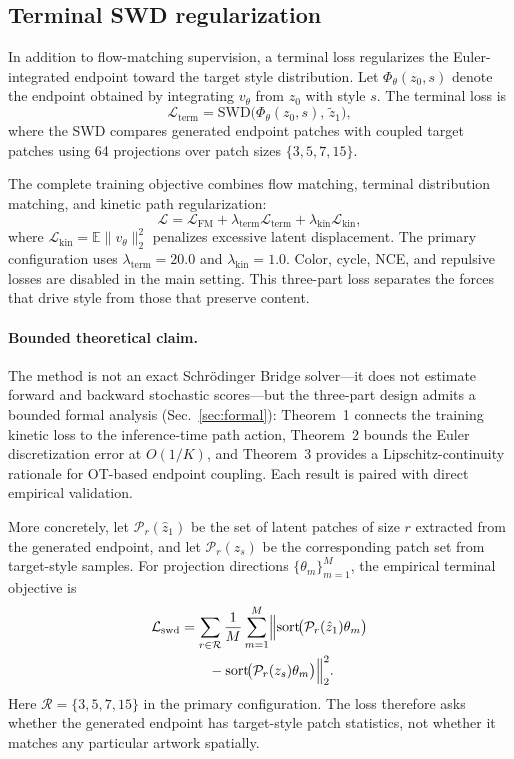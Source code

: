 ﻿\documentclass[letterpaper]{article}
\begin{document}
\subsection{Terminal SWD regularization}
In addition to flow-matching supervision, a terminal loss regularizes the Euler-integrated endpoint toward the target style distribution. Let $\Phi_\theta(z_0,s)$ denote the endpoint obtained by integrating $v_\theta$ from $z_0$ with style $s$. The terminal loss is
\begin{equation}
    \mathcal{L}_{\mathrm{term}} = \mathrm{SWD}\bigl(\Phi_\theta(z_0,s),\,\tilde{z}_1\bigr),
\end{equation}
where the SWD compares generated endpoint patches with coupled target patches using 64 projections over patch sizes $\{3,5,7,15\}$.

The complete training objective combines flow matching, terminal distribution matching, and kinetic path regularization:
\begin{equation}
    \mathcal{L} = \mathcal{L}_{\mathrm{FM}} + \lambda_{\mathrm{term}}\mathcal{L}_{\mathrm{term}} + \lambda_{\mathrm{kin}}\mathcal{L}_{\mathrm{kin}},
\end{equation}
where $\mathcal{L}_{\mathrm{kin}} = \mathbb{E}\|v_\theta\|_2^2$ penalizes excessive latent displacement. The primary configuration uses $\lambda_{\mathrm{term}}=20.0$ and $\lambda_{\mathrm{kin}}=1.0$. Color, cycle, NCE, and repulsive losses are disabled in the main setting. This three-part loss separates the forces that drive style from those that preserve content.

\paragraph{Bounded theoretical claim.}
The method is not an exact Schr\"odinger Bridge solver---it does not
estimate forward and backward stochastic scores---but the three-part
design admits a bounded formal analysis (Sec.~\ref{sec:formal}):
Theorem~1 connects the training kinetic loss to the inference-time
path action, Theorem~2 bounds the Euler discretization error at
$O(1/K)$, and Theorem~3 provides a Lipschitz-continuity rationale
for OT-based endpoint coupling.
Each result is paired with direct empirical validation.

More concretely, let $\mathcal{P}_r(\hat{z}_1)$ be the set of latent patches of size $r$ extracted from the generated endpoint, and let $\mathcal{P}_r(z_s)$ be the corresponding patch set from target-style samples. For projection directions $\{\theta_m\}_{m=1}^M$, the empirical terminal objective is
\begin{align}
    \mathcal{L}_{\mathrm{swd}} &=
    \sum_{r\in\mathcal{R}} \frac{1}{M} \sum_{m=1}^{M}
    \Bigl\|
    \operatorname{sort}\!\bigl(\mathcal{P}_r(\hat{z}_1)\theta_m\bigr) \notag \\
    &\qquad - \operatorname{sort}\!\bigl(\mathcal{P}_r(z_s)\theta_m\bigr)
    \Bigr\|_2^2 .
\end{align}
Here $\mathcal{R}=\{3,5,7,15\}$ in the primary configuration. The loss therefore asks whether the generated endpoint has target-style patch statistics, not whether it matches any particular artwork spatially.
\end{document}
